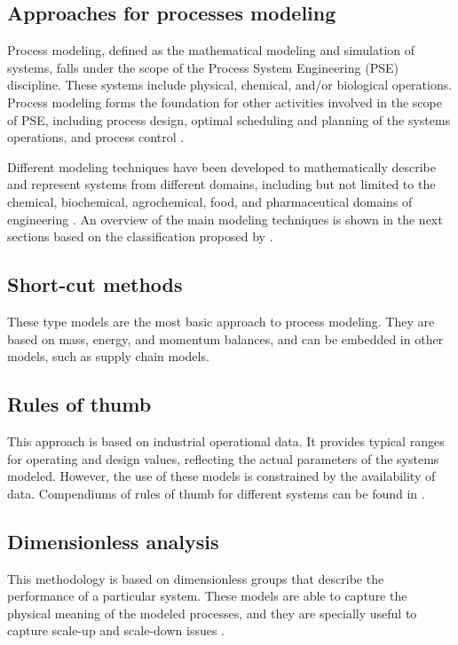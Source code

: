 \begin{refsection}[referencesCh1]
\section{Approaches for processes modeling}
Process modeling, defined as the mathematical modeling and simulation of systems, falls under the scope of the Process System Engineering (PSE) discipline. These systems include physical, chemical, and/or biological operations. Process modeling forms the foundation for other activities involved in the scope of PSE, including process design, optimal scheduling and planning of the systems operations, and process control \citep{STEPHANOPOULOS20114272}.

Different modeling techniques have been developed to mathematically describe and represent systems from different domains, including but not limited to the chemical, biochemical, agrochemical, food, and pharmaceutical domains of engineering \citep{PISTIKOPOULOS2021107252}. An overview of the main modeling techniques is shown in the next sections based on the classification proposed by \citet{MARTIN201216}.

\subsection{Short-cut methods}
These type models are the most basic approach to process modeling. They are based on mass, energy, and momentum balances, and can be embedded in other models, such as supply chain models.

\subsection{Rules of thumb}
This approach is based on industrial operational data. It provides typical ranges for operating and design values, reflecting the actual parameters of the systems modeled. However, the use of these models is constrained by the availability of data. Compendiums of rules of thumb for different systems can be found in \citet{couper2005chemical, hall2012rules, sadhukhan2014biorefineries}.

\subsection{Dimensionless analysis}
This methodology is based on dimensionless groups that describe the performance of a particular system. These models are able to capture the physical meaning of the modeled processes, and they are specially useful to capture scale-up and scale-down issues \citep{szirtes2007applied}.


\end{refsection}
